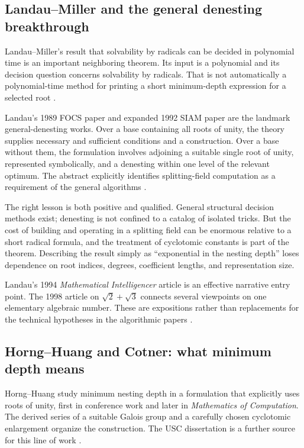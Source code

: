 \documentclass[11pt,oneside]{article}
\numberwithin{equation}{section}
\theoremstyle{definition}
\theoremstyle{remark}
\begin{document}
\subsection{Landau--Miller and the general denesting breakthrough}
Landau--Miller's result that solvability by radicals can be decided in polynomial time is an important neighboring theorem. Its input is a polynomial and its decision question concerns solvability by radicals. That is not automatically a polynomial-time method for printing a short minimum-depth expression for a selected root \cite{landaumiller}.

Landau's 1989 FOCS paper and expanded 1992 SIAM paper are the landmark general-denesting works. Over a base containing all roots of unity, the theory supplies necessary and sufficient conditions and a construction. Over a base without them, the formulation involves adjoining a suitable single root of unity, represented symbolically, and a denesting within one level of the relevant optimum. The abstract explicitly identifies splitting-field computation as a requirement of the general algorithms \cite{landau}.

The right lesson is both positive and qualified. General structural decision methods exist; denesting is not confined to a catalog of isolated tricks. But the cost of building and operating in a splitting field can be enormous relative to a short radical formula, and the treatment of cyclotomic constants is part of the theorem. Describing the result simply as ``exponential in the nesting depth'' loses dependence on root indices, degrees, coefficient lengths, and representation size.

Landau's 1994 \emph{Mathematical Intelligencer} article is an effective narrative entry point. The 1998 article on $\sqrt2+\sqrt3$ connects several viewpoints on one elementary algebraic number. These are expositions rather than replacements for the technical hypotheses in the algorithmic papers \cite{landau94,landauviews}.

\subsection{Horng--Huang and Cotner: what minimum depth means}
Horng--Huang study minimum nesting depth in a formulation that explicitly uses roots of unity, first in conference work and later in \emph{Mathematics of Computation}. The derived series of a suitable Galois group and a carefully chosen cyclotomic enlargement organize the construction. The USC dissertation is a further source for this line of work \cite{hornghuang,horngthesis}.
\end{document}

